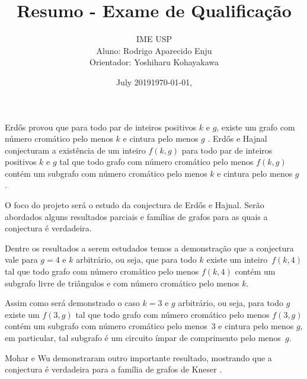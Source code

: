 \documentclass{article}
\title{Resumo - Exame de Qualificação}
\author{IME USP\\Aluno: Rodrigo Aparecido Enju\\Orientador: Yoshiharu Kohayakawa }
\date{July 2019}
\begin{document}
\linenumbers 
\shortdate
\yyyymmdddate
{}
\date{\today, \currenttime}
\renewcommand{\abstractname}{Resumo}
\onehalfspace

\maketitle

Erd\H{o}s provou que para todo par de inteiros positivos $k$ e $g$, existe um grafo com número cromático pelo menos $k$ e cintura pelo menos $g$ \cite{erdos1959graph}. Erd\H{o}s e Hajnal conjecturam a existência de um inteiro $f(k,g)$ para todo par de inteiros positivos $k$ e $g$ tal que todo grafo com número cromático pelo menos $f(k,g)$ contém um subgrafo com número cromático pelo menos $k$ e cintura pelo menos $g$ \cite{erdos1969conj}.

O foco do projeto será o estudo da conjectura de Erd\H{o}s e Hajnal. Serão abordados alguns resultados parciais e famílias de grafos para as quais a conjectura é verdadeira.

Dentre os resultados a serem estudados temos a demonstração que a conjectura vale para $g = 4$ e $k$ arbitrário, ou seja, que para todo $k$ existe um inteiro~$f(k,4)$ tal que todo grafo com número cromático pelo menos $f(k,4)$ contém um subgrafo livre de triângulos e com número cromático pelo menos $k$. 

Assim como será demonstrado o caso $k=3$ e $g$ arbitrário, ou seja, para todo $g$ existe um $f(3,g)$ tal que todo grafo com número cromático pelo menos $f(3,g)$ contém um subgrafo com número cromático pelo menos~$3$ e cintura pelo menos $g$, em particular, tal subgrafo é um circuito ímpar de comprimento pelo menos~$g$.

Mohar e Wu demonstraram outro importante resultado, mostrando que a conjectura é verdadeira para a família de grafos de Kneser \cite{mohar2015triangle}.




\endgroup
\end{document}

